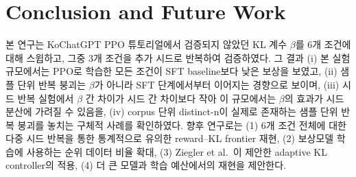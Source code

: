 \documentclass[conference]{IEEEtran}
\begin{document}
\section{Conclusion and Future Work}

본 연구는 KoChatGPT PPO 튜토리얼에서 검증되지 않았던 KL 계수 $\beta$를
6개 조건에 대해 스윕하고, 그중 3개 조건을 추가 시드로 반복하여 검증하였다.
그 결과 (i) 본 실험 규모에서는 PPO로 학습한 모든 조건이 SFT baseline보다
낮은 보상을 보였고, (ii) 샘플 단위 반복 붕괴는 $\beta$가 아니라 SFT
단계에서부터 이어지는 경향으로 보이며, (iii) 시드 반복 실험에서 $\beta$
간 차이가 시드 간 차이보다 작아 이 규모에서는 $\beta$의 효과가 시드
분산에 가려질 수 있음을, (iv) corpus 단위 distinct-n이 실제로 존재하는
샘플 단위 반복 붕괴를 놓치는 구체적 사례를 확인하였다. 향후 연구로는
(1) 6개 조건 전체에 대한 다중 시드 반복을 통한 통계적으로 유의한
reward--KL frontier 재현, (2) 보상모델 학습에 사용하는 순위 데이터
비율 확대, (3) Ziegler et al.~\cite{ziegler2019finetuning}이 제안한
adaptive KL controller의 적용, (4) 더 큰 모델과 학습 예산에서의 재현을
제안한다.



\end{document}
